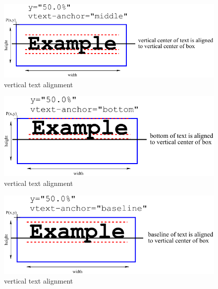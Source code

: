 \begin{figure}[!ht]
\begin{center}
\includegraphics[scale=0.60]{figures/VerticalTextPlacement3}
\end{center}
\caption{vertical text alignment }
\label{VerticalTextPlacement3}
\end{figure}

\begin{figure}[!ht]
\begin{center}
\includegraphics[scale=0.60]{figures/VerticalTextPlacement4}
\end{center}
\caption{vertical text alignment }
\label{VerticalTextPlacement4}
\end{figure}

\begin{figure}[!ht]
\begin{center}
\includegraphics[scale=0.60]{figures/VerticalTextPlacement5}
\end{center}
\caption{vertical text alignment }
\label{VerticalTextPlacement5}
\end{figure}


